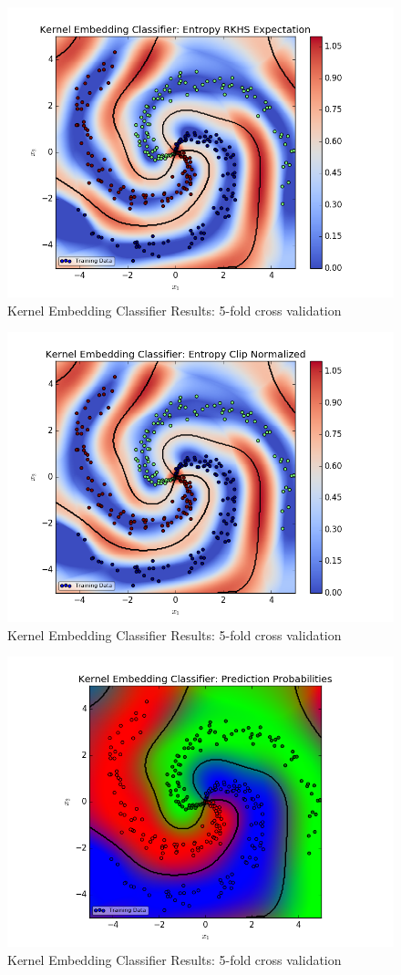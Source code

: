 \documentclass[a4paper, 12pt]{article}
\begin{document}
		\begin{figure}[!htbp]
			\centering
			\includegraphics[width=0.8\linewidth]{figures/5cv/figure_2.png}
			\caption{Kernel Embedding Classifier Results: 5-fold cross validation}
			\label{fig:5figure_2}
		\end{figure}
		
		\begin{figure}[!htbp]
			\centering
			\includegraphics[width=0.8\linewidth]{figures/5cv/figure_3.png}
			\caption{Kernel Embedding Classifier Results: 5-fold cross validation}
			\label{fig:5figure_3}
		\end{figure}
		
		\begin{figure}[!htbp]
			\centering
			\includegraphics[width=0.8\linewidth]{figures/5cv/figure_4.png}
			\caption{Kernel Embedding Classifier Results: 5-fold cross validation}
			\label{fig:5figure_4}
		\end{figure}
		
\end{document}

